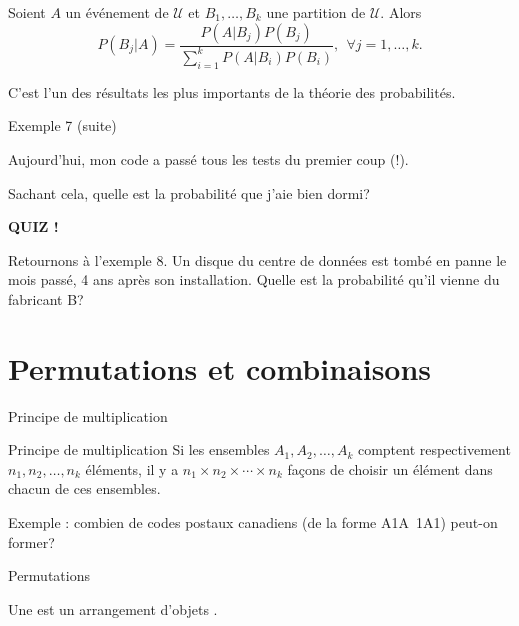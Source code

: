 \documentclass{BeamerTemplate}
\newcommand{\cibleReponse}{}
\newcommand{\lienreponse}[1]{\gdef\cibleReponse{#1}}
\begin{document}
\begin{frame}
 \begin{thm}{}
  Soient $A$ un événement de $\mathcal{U}$ et $B_1,\ldots,B_k$ une partition
  de $\mathcal{U}$. Alors
  $$P(B_j|A)=\frac{P(A|B_j)P(B_j)}{\sum_{i=1}^kP(A|B_i)P(B_i)},\ \ \forall j=1,\ldots,k.$$
 \end{thm}
C'est l'un des résultats les plus importants de la théorie des probabilités.

\end{frame}

\begin{frame}[t,label=ex7b]{Exemple 7 (suite)}

Aujourd'hui, mon code a passé tous les tests du premier coup (!).
\bigskip

Sachant cela, quelle est la probabilité que j'aie bien dormi?

\lienreponse{rep-ex2}
\end{frame}


\begin{frame}[t,label=quizbayes]

\centerline{\LARGE\bfseries\alert{QUIZ !}}
  Retournons à l'exemple 8. Un disque du centre de données est tombé en panne le mois passé,
  4 ans après son installation. Quelle est la probabilité qu'il vienne du fabricant B?
 \vspace{5cm}


\lienreponse{rep-quiz}
\end{frame}

\section{Permutations et combinaisons}

\begin{frame}[t]{Principe de multiplication}
 \begin{Boite}{Principe de multiplication}
  Si les ensembles $A_1,A_2,\ldots,A_k$ comptent respectivement $n_1,n_2,\ldots,n_k$
  éléments, il y a $n_1\times n_2\times\cdots\times n_k$ façons de choisir un élément
  dans chacun de ces ensembles.
 \end{Boite}

 \medskip
 Exemple : combien de codes postaux canadiens (de la forme A1A~1A1) peut-on former?
\end{frame}

\begin{frame}[t]{Permutations}
 \begin{defn}{}
  Une  est un arrangement 
  d'objets .
 \end{defn}

 \medskip


\end{frame}
\end{document}
